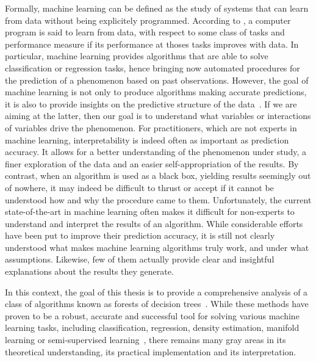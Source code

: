 Formally, machine learning can be defined as the study of systems that can
learn from data without being explicitely programmed. According to
\citet{mitchell:1997}, a computer program is said to learn from data, with
respect to some class of tasks and performance measure if its performance at
thoses tasks improves with data. In particular, machine learning provides
algorithms that are able to solve classification or regression tasks, hence
bringing now automated procedures for the prediction of a phenomenon based on
past observations. However, the goal of machine learning is not only to produce
algorithms making accurate predictions, it is also to provide insights on the
predictive structure of the data~\citep{breiman:1984}. If we are aiming at the
latter, then our goal is to understand what variables or interactions of
variables drive the phenomenon. For practitioners, which are not experts in
machine learning, interpretability is indeed often as important as prediction
accuracy. It allows for a better understanding of the phenomenon under study, a
finer exploration of the data and an easier self-appropriation of the results.
By contrast, when an algorithm is used as a black box, yielding results
seemingly out of nowhere, it may indeed be difficult to thrust or accept if it
cannot be understood how and why the procedure came to them. Unfortunately, the
current state-of-the-art in machine learning often makes it difficult for
non-experts to understand and interpret the results of an algorithm. While
considerable efforts have been put to improve their prediction accuracy, it is
still not clearly understood what makes machine learning algorithms truly work,
and under what assumptions. Likewise, few of them actually provide clear and
insightful explanations about the results they generate.

In this context, the goal of this thesis is to provide a comprehensive analysis
of a class of algorithms known as forests of decision
trees~\citep{breiman:2001,geurts:2006}. While these methods have proven to be
a robust, accurate and successful tool for solving various machine learning
tasks, including classification, regression, density estimation, manifold
learning or semi-supervised learning~\citep{criminisi:2011}, there remains
many gray areas in its theoretical understanding, its practical implementation
and its interpretation. 





